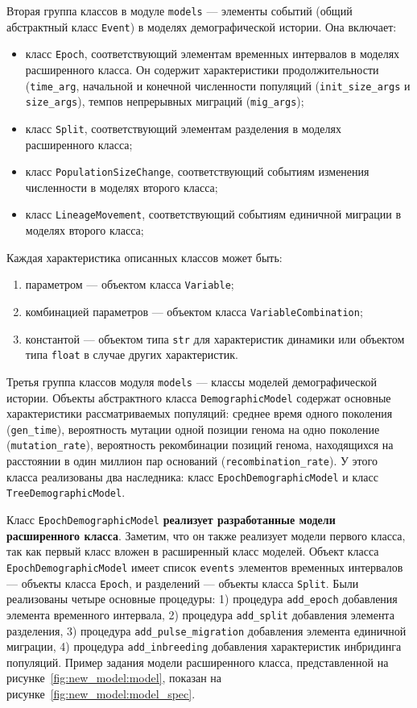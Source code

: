 Вторая группа классов в модуле \texttt{models} --- элементы событий (общий абстрактный класс \texttt{Event}) в моделях демографической истории.
Она включает:
\begin{itemize}
    \item класс \texttt{Epoch}, соответствующий элементам временных интервалов в моделях расширенного класса.
    Он содержит характеристики продолжительности (\texttt{time\_arg}, начальной и конечной численности популяций (\texttt{init\_size\_args} и \texttt{size\_args}), темпов непрерывных миграций (\texttt{mig\_args});
    \item класс \texttt{Split}, соответствующий элементам разделения в моделях расширенного класса;
    \item класс \texttt{PopulationSizeChange}, соответствующий событиям изменения численности в моделях второго класса;
    \item класс \texttt{LineageMovement}, соответствующий событиям единичной миграции в моделях второго класса;
\end{itemize}
Каждая характеристика описанных классов может быть:
\begin{enumerate}
    \item параметром --- объектом класса \texttt{Variable};
    \item комбинацией параметров --- объектом класса \texttt{VariableCombination};
    \item константой --- объектом типа \texttt{str} для характеристик динамики или объектом типа \texttt{float} в случае других характеристик.
\end{enumerate}

Третья группа классов модуля \texttt{models} --- классы моделей демографической истории.
Объекты абстрактного класса \texttt{DemographicModel} содержат основные характеристики рассматриваемых популяций: среднее время одного поколения (\texttt{gen\_time}), вероятность мутации одной позиции генома на одно поколение (\texttt{mutation\_rate}), вероятность рекомбинации позиций генома, находящихся на расстоянии в один миллион пар оснований (\texttt{recombination\_rate}).
У этого класса реализованы два наследника: класс \texttt{EpochDemographicModel} и класс \texttt{TreeDemographicModel}.

Класс \texttt{EpochDemographicModel} \textbf{реализует разработанные модели расширенного класса}.
Заметим, что он также реализует модели первого класса, так как первый класс вложен в расширенный класс моделей.
Объект класса \texttt{EpochDemographicModel} имеет список \texttt{events} элементов временных интервалов --- объекты класса \texttt{Epoch}, и разделений --- объекты класса \texttt{Split}.
Были реализованы четыре основные процедуры: 1) процедура \texttt{add\_epoch} добавления элемента временного интервала, 2) процедура \texttt{add\_split} добавления элемента разделения, 3) процедура \texttt{add\_pulse\_migration} добавления элемента единичной миграции, 4) процедура \texttt{add\_inbreeding} добавления характеристик инбридинга популяций.
Пример задания модели расширенного класса, представленной на рисунке~\ref{fig:new_model:model}, показан на рисунке~\ref{fig:new_model:model_spec}.

